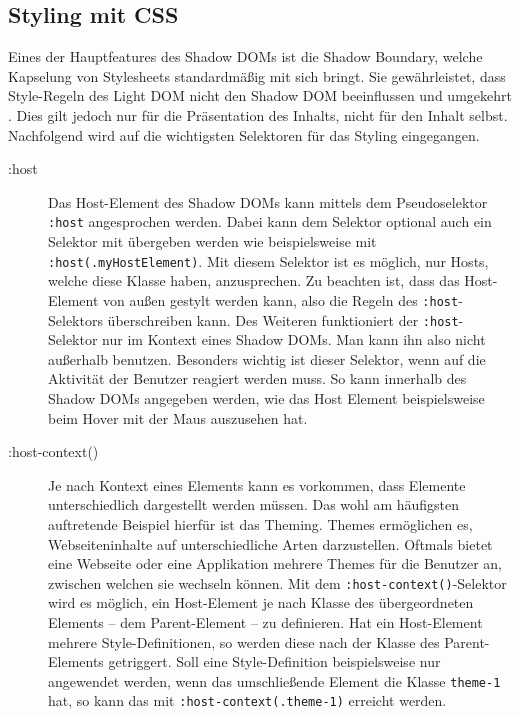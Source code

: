 \subsection{Styling mit CSS}\label{styling-mit-css}

Eines der Hauptfeatures des Shadow \ac{DOM}s ist die Shadow Boundary, welche Kapselung von Stylesheets standardmäßig mit sich bringt. Sie gewährleistet, dass Style-Regeln des Light \ac{DOM} nicht den Shadow \ac{DOM} beeinflussen und umgekehrt \cite{citeulike:13851334}. Dies gilt jedoch nur für die Präsentation des Inhalts, nicht für den Inhalt selbst. Nachfolgend wird auf die wichtigsten Selektoren für das Styling eingegangen.

\begin{description}
  \item[:host] Das Host-Element des Shadow \ac{DOM}s kann mittels dem Pseudoselektor \texttt{:host} angesprochen werden. Dabei kann dem Selektor optional auch ein Selektor mit übergeben werden wie beispielsweise mit \texttt{:host(.myHostElement)}. Mit diesem Selektor ist es möglich, nur Hosts, welche diese Klasse haben, anzusprechen. Zu beachten ist, dass das Host-Element von außen gestylt werden kann, also die Regeln des \texttt{:host}-Selektors überschreiben kann. Des Weiteren funktioniert der \texttt{:host}-Selektor nur im Kontext eines Shadow \ac{DOM}s. Man kann ihn also nicht außerhalb benutzen. Besonders wichtig ist dieser Selektor, wenn auf die Aktivität der Benutzer reagiert werden muss. So kann innerhalb des Shadow \ac{DOM}s angegeben werden, wie das Host Element beispielsweise beim Hover mit der Maus auszusehen hat.
  \item[:host-context()] Je nach Kontext eines Elements kann es vorkommen, dass Elemente unterschiedlich dargestellt werden müssen. Das wohl am häufigsten auftretende Beispiel hierfür ist das Theming. Themes ermöglichen es, Webseiteninhalte auf unterschiedliche Arten darzustellen. Oftmals bietet eine Webseite oder eine Applikation mehrere Themes für die Benutzer an, zwischen welchen sie wechseln können. Mit dem \texttt{:host-context()}-Selektor wird es möglich, ein Host-Element je nach Klasse des übergeordneten Elements -- dem Parent-Element -- zu definieren. Hat ein Host-Element mehrere Style-Definitionen, so werden diese nach der Klasse des Parent-Elements getriggert. Soll eine Style-Definition beispielsweise nur angewendet werden, wenn das umschließende Element die Klasse \texttt{theme-1} hat, so kann das mit \texttt{:host-context(.theme-1)} erreicht werden.
\end{description}


